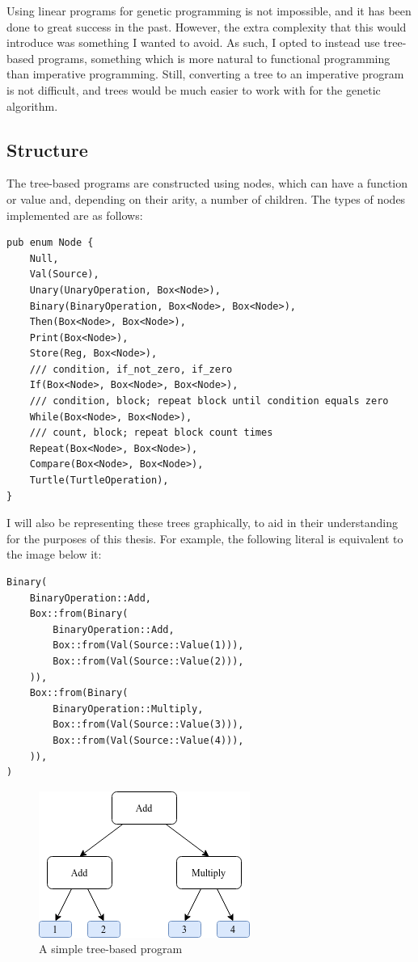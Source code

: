 \documentclass{report}
\begin{document}
Using linear programs for genetic programming is not impossible, and it has been done to great success in the past. However, the extra complexity that this would introduce was something I wanted to avoid. As such, I opted to instead use tree-based programs, something which is more natural to functional programming than imperative programming. Still, converting a tree to an imperative program is not difficult, and trees would be much easier to work with for the genetic algorithm.

\subsection{Structure}
The tree-based programs are constructed using nodes, which can have a function or value and, depending on their arity, a number of children. The types of nodes implemented are as follows:

\begin{verbatim}
pub enum Node {
    Null,
    Val(Source),
    Unary(UnaryOperation, Box<Node>),
    Binary(BinaryOperation, Box<Node>, Box<Node>),
    Then(Box<Node>, Box<Node>),
    Print(Box<Node>),
    Store(Reg, Box<Node>),
    /// condition, if_not_zero, if_zero
    If(Box<Node>, Box<Node>, Box<Node>),
    /// condition, block; repeat block until condition equals zero
    While(Box<Node>, Box<Node>),
    /// count, block; repeat block count times
    Repeat(Box<Node>, Box<Node>),
    Compare(Box<Node>, Box<Node>),
    Turtle(TurtleOperation),
}
\end{verbatim}

I will also be representing these trees graphically, to aid in their understanding for the purposes of this thesis. For example, the following literal is equivalent to the image below it:
\begin{verbatim}
Binary(
    BinaryOperation::Add,
    Box::from(Binary(
        BinaryOperation::Add,
        Box::from(Val(Source::Value(1))),
        Box::from(Val(Source::Value(2))),
    )),
    Box::from(Binary(
        BinaryOperation::Multiply,
        Box::from(Val(Source::Value(3))),
        Box::from(Val(Source::Value(4))),
    )),
)
\end{verbatim}

\begin{figure}[ht]
    \centering
    \includegraphics[scale=0.75]{tree_1}
    \caption{A simple tree-based program}
\end{figure}
\end{document}
